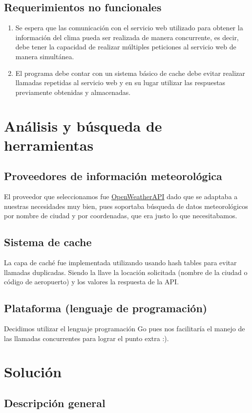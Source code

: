 \documentclass[10pt, letterpaper]{article}
\begin{document}
\subsection{Requerimientos no funcionales}

\begin{enumerate}
  \item Se espera que las comunicación con el servicio web utilizado para obtener la información del
  clima pueda ser realizada de manera concurrente, es decir, debe tener la capacidad de realizar múltiples
  peticiones al servicio web de manera simultánea.
  \item El programa debe contar con un sistema básico de cache debe evitar realizar llamadas
  repetidas al servicio web y en su lugar utilizar las respuestas previamente obtenidas y
  almacenadas. 
\end{enumerate}

\section{Análisis y búsqueda de herramientas}
\subsection{Proveedores de información meteorológica}
El proveedor que seleccionamos fue \href{http://www.google.com}{OpenWeatherAPI} dado que se adaptaba a nuestras necesidades muy bien, pues soportaba búsqueda de datos meteorológicos por nombre de ciudad y por coordenadas, que era justo lo que necesitabamos.
\subsection{Sistema de cache}
La capa de caché fue implementada utilizando usando hash tables para evitar llamadas duplicadas. Siendo la llave la locación solicitada (nombre de la ciudad o código de aeropuerto) y los valores la respuesta de la API.
\subsection{Plataforma (lenguaje de programación)}
Decidimos utilizar el lenguaje programación Go pues nos facilitaría el manejo de las llamadas
concurrentes para lograr el punto extra :).

\section{Solución}
\subsection{Descripción general}
\end{document}
